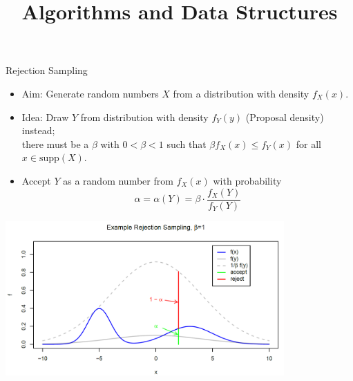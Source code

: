 \documentclass[11pt,compress,t,notes=noshow, xcolor=table]{beamer}
\title{Algorithms and Data Structures}
\begin{document}

\begin{vbframe}{Rejection Sampling}
\begin{itemize}
\item Aim: Generate random numbers $X$ from a distribution with density $f_X(x)$.
\item Idea: Draw $Y$ from distribution with density $f_Y(y)$ (Proposal density) instead; \\
 there must be a $\beta$ with $0 < \beta < 1$ such that $\beta f_X(x) \leq f_Y(x)$ for all
  $x \in \mbox{supp}(X)$.
\item Accept $Y$ as a random number from $f_X(x)$ with probability
  $$
  \alpha = \alpha(Y) = \beta \cdot \frac{f_X(Y)}{f_Y(Y)}
  $$
\end{itemize}

\framebreak


\begin{center}
\includegraphics[width =0.8\textwidth]{figure_man/rejection.png}
\end{center}






\end{vbframe}
\end{document}

